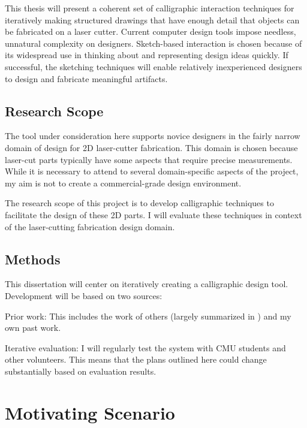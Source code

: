 \documentclass[12pt]{article}
\newenvironment{packed_enum}{
\begin{enumerate}
  \setlength{\itemsep}{1pt}
  \setlength{\parskip}{0pt}
  \setlength{\parsep}{0pt}
}{\end{enumerate}}
\begin{document}
This thesis will present a coherent set of calligraphic interaction
techniques for iteratively making structured drawings that have enough
detail that objects can be fabricated on a laser cutter. Current
computer design tools impose needless, unnatural complexity on
designers. Sketch-based interaction is chosen because of its
widespread use in thinking about and representing design ideas
quickly. If successful, the sketching techniques will enable
relatively inexperienced designers to design and fabricate meaningful
artifacts.

\subsection{Research Scope}

The tool under consideration here supports novice designers in the
fairly narrow domain of design for 2D laser-cutter fabrication. This
domain is chosen because laser-cut parts typically have some aspects
that require precise measurements. While it is necessary to attend to
several domain-specific aspects of the project, my aim is not to
create a commercial-grade design environment.

The research scope of this project is to develop calligraphic
techniques to facilitate the design of these 2D parts. I will evaluate
these techniques in context of the laser-cutting fabrication design
domain.

\subsection{Methods}

This dissertation will center on iteratively creating a calligraphic
design tool. Development will be based on two sources:

\begin{packed_enum}
\item Prior work: This includes the work of others (largely summarized
  in \cite{johnson-sketch-review}) and my own past work.
\item Iterative evaluation: I will regularly test the system with CMU
  students and other volunteers. This means that the plans outlined
  here could change substantially based on evaluation results.
\end{packed_enum}

\section{Motivating Scenario}
\end{document}
